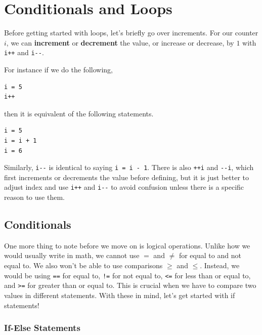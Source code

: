 \documentclass[../../main.tex]{subfiles}
\begin{document}
\section{Conditionals and Loops}

Before getting started with loops, let's briefly go over increments.
For our counter $i$, we can \textbf{increment} or \textbf{decrement}
the value, or increase or decrease, by $1$ with \verb|i++| and
\verb|i--|.

For instance if we do the following,

\begin{basicbox}
\begin{lstlisting}[style=basic]
i = 5
i++
\end{lstlisting}
\end{basicbox}

then it is equivalent of the following statements.

\begin{basicbox}
\begin{lstlisting}[style=basic]
i = 5
i = i + 1
i = 6
\end{lstlisting}
\end{basicbox}

Similarly, \verb|i--| is identical to saying \verb|i = i - 1|.
There is also \verb|++i| and \verb|--i|, which first increments or
decrements the value before defining, but it is just better to
adjust index and use \verb|i++| and \verb|i--| to avoid confusion
unless there is a specific reason to use them.

\subsection{Conditionals}

One more thing to note before we move on is logical operations.
Unlike how we would usually write in math, we cannot use $=$ and
$\neq$ for equal to and not equal to. We also won't be able to use
comparisons $\geq$ and $\leq$. Instead, we would be using \verb|==|
for equal to, \verb|!=| for not equal to, \verb|<=| for less than or
equal to, and \verb|>=| for greater than or equal to. This is
crucial when we have to compare two values in different statements.
With these in mind, let's get started with if statements!

\subsubsection{If-Else Statements}
\end{document}
